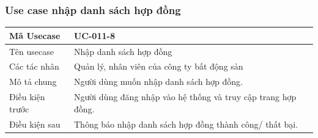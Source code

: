 \documentclass[12pt,a4paper]{article}
\begin{document}
    \subsubsection*{Use case nhập danh sách hợp đồng}
    \begin{table}[H]
        \centering
        \begin{tabular}{|p{3.5cm}|p{11.5cm}|c|}
            \hline
            Mã Usecase      & UC-011-8                                                      \\
            \hline
            Tên usecase     & Nhập danh sách hợp đồng                                       \\
            \hline
            Các tác nhân    & Quản lý, nhân viên của công ty bất động sản                   \\
            \hline
            Mô tả chung     & Người dùng muốn nhập danh sách hợp đồng.                      \\
            \hline

            Điều kiện trước & Người dùng đăng nhập vào hệ thống và truy cập trang hợp đồng. \\
            \hline

            Điều kiện sau   & Thông báo nhập danh sách hợp đồng thành công/ thất bại.       \\
            \hline


\end{tabular}
\end{table}
\end{document}

